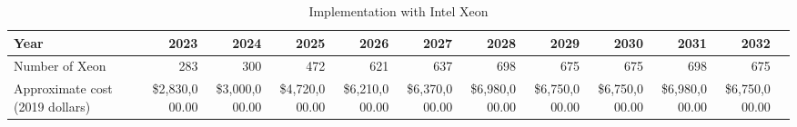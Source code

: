 \tiny \begin{longtable} { |p{}  |r  |r  |r  |r  |r  |r  |r  |r  |r  |r  |r |} 
\caption{Implementation with Intel Xeon \label{tab:opsXeon}}\\ 
\hline 
\textbf{Year}&\textbf{2023}&\textbf{2024}&\textbf{2025}&\textbf{2026}&\textbf{2027}&\textbf{2028}&\textbf{2029}&\textbf{2030}&\textbf{2031}&\textbf{2032} \\ \hline
{Number of Xeon}&{283}&{300}&{472}&{621}&{637}&{698}&{675}&{675}&{698}&{675} \\ \hline
{Approximate cost (2019 dollars)}&{\$2,830,000.00}&{\$3,000,000.00}&{\$4,720,000.00}&{\$6,210,000.00}&{\$6,370,000.00}&{\$6,980,000.00}&{\$6,750,000.00}&{\$6,750,000.00}&{\$6,980,000.00}&{\$6,750,000.00} \\ \hline
\end{longtable} \normalsize
